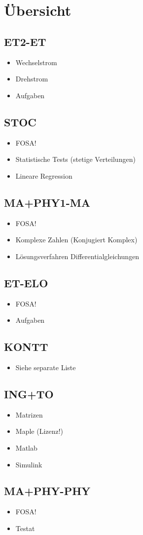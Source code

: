 
\section{Übersicht}

\subsection{ET2-ET}
\begin{itemize}
  \item Wechselstrom
  \item Drehstrom
  \item Aufgaben
\end{itemize}

\subsection{STOC}
\begin{itemize}
  \item FOSA!
  \item Statistische Tests (stetige Verteilungen)
  \item Lineare Regression
\end{itemize}

\subsection{MA+PHY1-MA}
\begin{itemize}
  \item FOSA!
  \item Komplexe Zahlen (Konjugiert Komplex)
  \item Lösungsverfahren Differentialgleichungen
\end{itemize}

\subsection{ET-ELO}
\begin{itemize}
  \item FOSA! 
  \item Aufgaben
\end{itemize}

\subsection{KONTT}
\begin{itemize}
  \item Siehe separate Liste
\end{itemize}

\subsection{ING+TO}
\begin{itemize}
  \item Matrizen
  \item Maple (Lizenz!)
  \item Matlab
  \item Simulink
\end{itemize}

\subsection{MA+PHY-PHY}
\begin{itemize}
  \item FOSA!
  \item Testat
\end{itemize}
